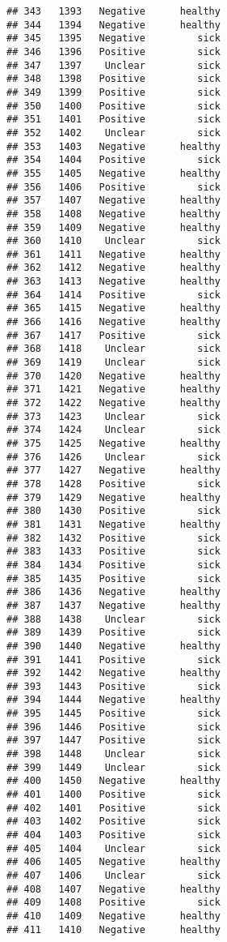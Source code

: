 \documentclass[
]{article}
\begin{document}
\begin{verbatim}
## 343   1393   Negative      healthy
## 344   1394   Negative      healthy
## 345   1395   Negative         sick
## 346   1396   Positive         sick
## 347   1397    Unclear         sick
## 348   1398   Positive         sick
## 349   1399   Positive         sick
## 350   1400   Positive         sick
## 351   1401   Positive         sick
## 352   1402    Unclear         sick
## 353   1403   Negative      healthy
## 354   1404   Positive         sick
## 355   1405   Negative      healthy
## 356   1406   Positive         sick
## 357   1407   Negative      healthy
## 358   1408   Negative      healthy
## 359   1409   Negative      healthy
## 360   1410    Unclear         sick
## 361   1411   Negative      healthy
## 362   1412   Negative      healthy
## 363   1413   Negative      healthy
## 364   1414   Positive         sick
## 365   1415   Negative      healthy
## 366   1416   Negative      healthy
## 367   1417   Positive         sick
## 368   1418    Unclear         sick
## 369   1419    Unclear         sick
## 370   1420   Negative      healthy
## 371   1421   Negative      healthy
## 372   1422   Negative      healthy
## 373   1423    Unclear         sick
## 374   1424    Unclear         sick
## 375   1425   Negative      healthy
## 376   1426    Unclear         sick
## 377   1427   Negative      healthy
## 378   1428   Positive         sick
## 379   1429   Negative      healthy
## 380   1430   Positive         sick
## 381   1431   Negative      healthy
## 382   1432   Positive         sick
## 383   1433   Positive         sick
## 384   1434   Positive         sick
## 385   1435   Positive         sick
## 386   1436   Negative      healthy
## 387   1437   Negative      healthy
## 388   1438    Unclear         sick
## 389   1439   Positive         sick
## 390   1440   Negative      healthy
## 391   1441   Positive         sick
## 392   1442   Negative      healthy
## 393   1443   Positive         sick
## 394   1444   Negative      healthy
## 395   1445   Positive         sick
## 396   1446   Positive         sick
## 397   1447   Positive         sick
## 398   1448    Unclear         sick
## 399   1449    Unclear         sick
## 400   1450   Negative      healthy
## 401   1400   Positive         sick
## 402   1401   Positive         sick
## 403   1402   Positive         sick
## 404   1403   Positive         sick
## 405   1404    Unclear         sick
## 406   1405   Negative      healthy
## 407   1406    Unclear         sick
## 408   1407   Negative      healthy
## 409   1408   Positive         sick
## 410   1409   Negative      healthy
## 411   1410   Negative      healthy

\end{verbatim}
\end{document}
